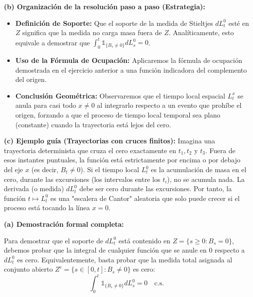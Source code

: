 \documentclass[11pt, letterpaper]{article}
\begin{document}
\begin{solucion}
    \textbf{(b) Organización de la resolución paso a paso (Estrategia):}
    \begin{itemize}
        \item[(i)] \textbf{Definición de Soporte:} Que el soporte de la medida de Stieltjes $dL_t^0$ esté en $Z$ significa que la medida no carga masa fuera de $Z$. Analíticamente, esto equivale a demostrar que $\int_0^t \mathbb{1}_{\{B_s \neq 0\}} dL_s^0 = 0$.
        \item[(ii)] \textbf{Uso de la Fórmula de Ocupación:} Aplicaremos la fórmula de ocupación demostrada en el ejercicio anterior a una función indicadora del complemento del origen.
        \item[(iii)] \textbf{Conclusión Geométrica:} Observaremos que el tiempo local espacial $L_t^x$ se anula para casi todo $x \neq 0$ al integrarlo respecto a un evento que prohíbe el origen, forzando a que el proceso de tiempo local temporal sea plano (constante) cuando la trayectoria está lejos del cero.
    \end{itemize}

    \vspace{3mm}
    \textbf{(c) Ejemplo guía (Trayectorias con cruces finitos):}
    Imagina una trayectoria determinista que cruza el cero exactamente en $t_1, t_2$ y $t_3$. Fuera de esos instantes puntuales, la función está estrictamente por encima o por debajo del eje $x$ (es decir, $B_t \neq 0$). Si el tiempo local $L_t^0$ es la acumulación de masa en el cero, durante las excursiones (los intervalos entre los $t_i$), no se acumula nada. La derivada (o medida) $dL_t^0$ debe ser cero durante las excursiones. Por tanto, la función $t \mapsto L_t^0$ es una "escalera de Cantor" aleatoria que solo puede crecer si el proceso está tocando la línea $x=0$.

    \vspace{3mm}
    \textbf{(a) Demostración formal completa:}

    Para demostrar que el soporte de $dL_t^0$ está contenido en $Z = \{s \ge 0 : B_s = 0\}$, debemos probar que la integral de cualquier función que se anule en $0$ respecto a $dL_t^0$ es cero.
    Equivalentemente, basta probar que la medida total asignada al conjunto abierto $Z^c = \{s \in [0,t] : B_s \neq 0\}$ es cero:
    \[ \int_0^t \mathbb{1}_{\{B_s \neq 0\}} dL_s^0 = 0 \quad \text{c.s.} \]


\end{solucion}
\end{document}
